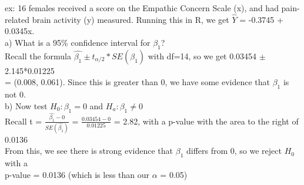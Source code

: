 \documentclass[12pt, a4paper]{article}
\begin{document}
	\noindent ex: 16 females received a score on the Empathic Concern Scale (x), and had pain-related brain activity (y) measured. Running this in R, we get $\hat{Y}$ = -0.3745 + 0.0345x. \\ a) What is a 95\% confidence interval for $\beta_1$? \\
	Recall the formula $\hat{\beta_1} \pm t_{\alpha/2}*SE(\hat{\beta_1})$ with df=14, so we get 0.03454 $\pm$ 2.145*0.01225 \\ = (0.008, 0.061). Since this is greater than 0, we have some evidence that $\beta_1$ is not 0. \\ b) Now test $H_0: \beta_1 = 0$ and $H_a: \beta_1 \neq 0$ \\
	Recall t = $\frac{\hat{\beta_1}-0}{SE(\hat{\beta_1})}$ = $\frac{0.03454-0}{0.01225}$ = 2.82, with a p-value with the area to the right of 0.0136 \\
	From this, we see there is strong evidence that $\beta_1$ differs from 0, so we reject $H_0$ with a \\ p-value = 0.0136 (which is less than our $\alpha$ = 0.05) \\~\\
	
\end{document}
